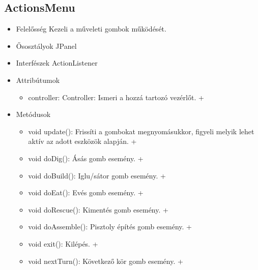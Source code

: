 \subsection{ActionsMenu}
\begin{itemize}
	\item Felelősség\newline
	Kezeli a műveleti gombok működését.
	\item Ősosztályok\newline
	JPanel
	\item Interfészek\newline
	ActionListener
	\item Attribútumok\newline
	\begin{itemize}
		\item controller: Controller: Ismeri a hozzá tartozó vezérlőt. +	
	\end{itemize}
	\item Metódusok\newline
	\begin{itemize}
		\item void update(): Frissíti a gombokat megnyomásukkor, figyeli melyik lehet aktív az adott eszközök alapján. +
		\item void doDig(): Ásás gomb esemény. +
		\item void doBuild(): Iglu/sátor gomb esemény. +
		\item void doEat(): Evés gomb esemény. +
		\item void doRescue(): Kimentés gomb esemény. +
		\item void doAssemble(): Pisztoly építés gomb esemény. +
		\item void exit(): Kilépés. +
		\item void nextTurn(): Következő kör gomb esemény. +
	\end{itemize}
\end{itemize}

